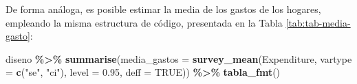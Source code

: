 \documentclass[
  spanish,
  12pt,
]{book}
\newenvironment{Shaded}{\begin{snugshade}}{\end{snugshade}}
\newcommand{\AttributeTok}[1]{\textcolor[rgb]{0.13,0.29,0.53}{#1}}
\newcommand{\ConstantTok}[1]{\textcolor[rgb]{0.56,0.35,0.01}{#1}}
\newcommand{\FloatTok}[1]{\textcolor[rgb]{0.00,0.00,0.81}{#1}}
\newcommand{\FunctionTok}[1]{\textcolor[rgb]{0.13,0.29,0.53}{\textbf{#1}}}
\newcommand{\NormalTok}[1]{#1}
\newcommand{\SpecialCharTok}[1]{\textcolor[rgb]{0.81,0.36,0.00}{\textbf{#1}}}
\newcommand{\StringTok}[1]{\textcolor[rgb]{0.31,0.60,0.02}{#1}}
\begin{document}
De forma análoga, es posible estimar la media de los gastos de los hogares, empleando la misma estructura de código, presentada en la Tabla \ref{tab:tab-media-gasto}:

\begin{Shaded}
\begin{Highlighting}[]
\NormalTok{diseno }\SpecialCharTok{\%\textgreater{}\%}
  \FunctionTok{summarise}\NormalTok{(}\AttributeTok{media\_gastos =} \FunctionTok{survey\_mean}\NormalTok{(Expenditure,}
                                    \AttributeTok{vartype =} \FunctionTok{c}\NormalTok{(}\StringTok{"se"}\NormalTok{, }\StringTok{"ci"}\NormalTok{),}
                                    \AttributeTok{level =} \FloatTok{0.95}\NormalTok{,}
                                    \AttributeTok{deff =} \ConstantTok{TRUE}\NormalTok{)) }\SpecialCharTok{\%\textgreater{}\%}
  \FunctionTok{tabla\_fmt}\NormalTok{()}
\end{Highlighting}
\end{Shaded}
\end{document}

